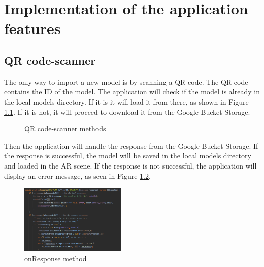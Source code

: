 \chapter{Implementation of the application features}\label{cap:aplicationfeatures}

\section{QR code-scanner}
The only way to import a new model is by scanning a QR code. The QR code contains the ID of the model. The application will check if the model is already in the local models directory. If it is it will load it from there, as shown in Figure \ref{fig:loadModelQR}. If it is not, it will proceed to download it from the Google Bucket Storage.

\begin{figure}
    \centering
    \vspace{0.3cm}
    \caption{QR code-scanner methods}
    \label{fig:loadModelQR}
\end{figure}



Then the application will handle the response from the Google Bucket Storage. If the response is successful, the model will be saved in the local models directory and loaded in the \ac{AR} scene. If the response is not successful, the application will display an error message, as seen in Figure \ref{fig:onResponse}.


\begin{figure}
    \centering
    \includegraphics[width=0.45\textwidth]{img/code/onResponse.png}
    \caption{onResponse method}
    \label{fig:onResponse}
\end{figure}

